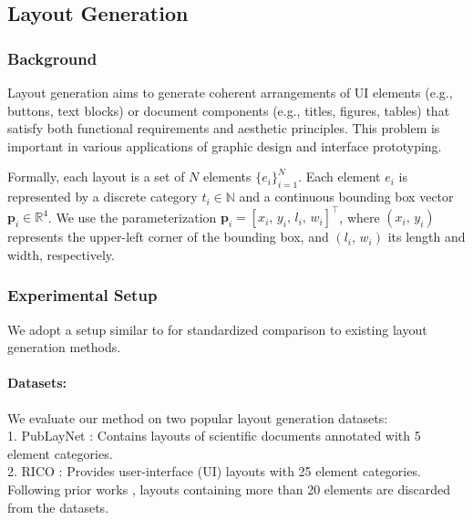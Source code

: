 \subsection{Layout Generation}

\subsubsection{Background}
Layout generation aims to generate coherent arrangements of UI elements (e.g., buttons, text blocks) or document components
(e.g., titles, figures, tables) that satisfy both functional requirements and aesthetic principles. This problem is important 
in various applications of graphic design and interface prototyping.

Formally, each layout is a set of $N$ elements $\{ e_i \}_{i=1}^N$. Each element $e_i$ is represented by a discrete category $t_i \in \mathbb{N}$  and a continuous bounding box vector $\mathbf{p}_i \in \mathbb{R}^4$. We use the parameterization $\mathbf{p}_i = [x_i,\, y_i,\, l_i,\, w_i]^\top$, where $(x_i,\, y_i)$ represents the upper-left corner of the bounding box, and $(l_i,\, w_i)$ its length and width, respectively.

\subsubsection{Experimental Setup}
We adopt a setup similar to \cite{guerreiro2025layoutflow} for standardized comparison to existing layout generation methods.

\paragraph{Datasets:}
We evaluate our method on two popular layout generation datasets:
\\
 1. PubLayNet \cite{zhong2019publaynet}: Contains layouts of scientific documents annotated with 5 element categories.
\\
 2. RICO \cite{deka2017rico}: Provides user-interface (UI) layouts with 25 element categories.\\
Following prior works \cite{jiang2023layoutformer++, zhang2023layoutdiffusion}, layouts containing more than 20 elements are discarded from the datasets.

